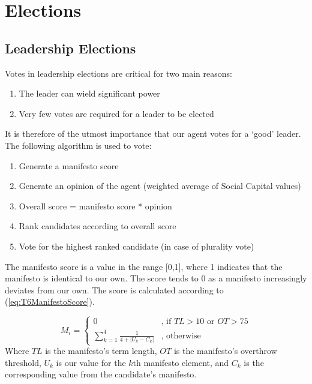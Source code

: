\section{Elections}

\subsection{Leadership Elections}

Votes in leadership elections are critical for two main reasons:
\begin{enumerate}
    \item The leader can wield significant power
    \item Very few votes are required for a leader to be elected
\end{enumerate}
It is therefore of the utmost importance that our agent votes for a `good' leader. The following algorithm is used to vote:
\begin{enumerate}
    \item Generate a manifesto score
    \item Generate an opinion of the agent (weighted average of Social Capital values)
    \item Overall score = manifesto score * opinion
    \item Rank candidates according to overall score
    \item Vote for the highest ranked candidate (in case of plurality vote)
\end{enumerate}
The manifesto score is a value in the range [0,1], where 1 indicates that the manifesto is identical to our own. The score tends to 0 as a manifesto increasingly deviates from our own. The score is calculated according to (\ref{eq:T6ManifestoScore}).

\begin{equation}\label{eq:T6ManifestoScore}
    M_{i}=\left\{
    	\begin{array}{ll}
    		0 & \mbox{, if } TL > 10 \mbox{ or } OT > 75 \\
    	  \sum_{k=1}^{4}\frac{1}{4+\left | U_{k} - C_{k} \right |} & \mbox{, otherwise} 
    	\end{array}\right.
\end{equation}
Where $TL$ is the manifesto's term length, $OT$ is the manifesto's overthrow threshold, $U_k$ is our value for 
the $k$th manifesto element, and $C_k$ is the corresponding value from the candidate's manifesto.\\

